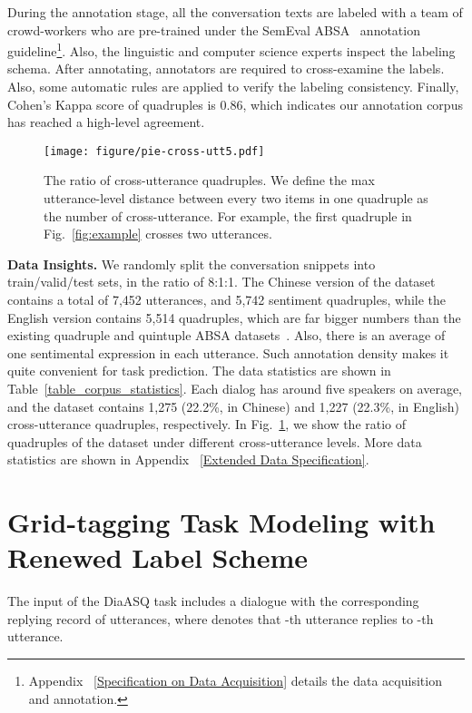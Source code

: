 \documentclass[11pt]{article}
\begin{document}
During the annotation stage, all the conversation texts are labeled with a team of crowd-workers who are pre-trained under the SemEval ABSA~\cite{PontikiGPPAM14} annotation guideline\footnote{
Appendix ~\ref{Specification on Data Acquisition} details the data acquisition and annotation.
}.
Also, the linguistic and computer science experts inspect the labeling schema.
After annotating, annotators are required to cross-examine the labels.
Also, some automatic rules are applied to verify the labeling consistency.
Finally, Cohen’s Kappa score of quadruples is 0.86, which indicates our annotation corpus has reached a high-level agreement. 

\begin{figure}[!t]
  \centering
  \texttt{[image: figure/pie-cross-utt5.pdf]}
  \caption{
  The ratio of cross-utterance quadruples.
  We define the max utterance-level distance between every two items in one quadruple as the number of cross-utterance.
  For example, the first quadruple in Fig.~\ref{fig:example} crosses two utterances.
  }
  \label{cross-utt}
  \vspace{-10pt}
\end{figure}

\vspace{2pt}
\textbf{Data Insights.}
We randomly split the conversation snippets into train/valid/test sets, in the ratio of 8:1:1.
The Chinese version of the dataset contains a total of 7,452 utterances, and 5,742 sentiment quadruples, while the English version contains 5,514 quadruples, which are far bigger numbers than the existing quadruple and quintuple ABSA datasets~\cite{CaiXY20, ZhangD0YBL21}.
Also, there is an average of one sentimental expression in each utterance.
Such annotation density makes it quite convenient for task prediction.
The data statistics are shown in Table~\ref{table_corpus_statistics}.
Each dialog has around five speakers on average, and the dataset contains 1,275 (22.2\%, in Chinese) and 1,227 (22.3\%, in English) cross-utterance quadruples, respectively.
In Fig.~\ref{cross-utt}, we show the ratio of quadruples of the dataset under different cross-utterance levels.
More data statistics are shown in Appendix ~\ref{Extended Data Specification}.

\section{Grid-tagging Task Modeling with Renewed Label Scheme}
\label{Grid-tagging Modeling with Renewed Label Scheme}
The input of the DiaASQ task includes a dialogue  with the corresponding replying record  of utterances, where  denotes that -th utterance replies to -th utterance.
\end{document}
